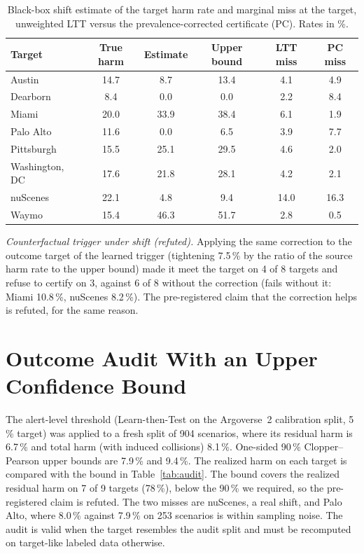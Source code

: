 \documentclass[lettersize,journal]{IEEEtran}
\begin{document}
\begin{table}[h]
\caption{Black-box shift estimate of the target harm rate and marginal miss
at the target, unweighted LTT versus the prevalence-corrected certificate
(PC). Rates in \%.}
\label{tab:prev}
\centering
\scriptsize\setlength{\tabcolsep}{2.5pt}
\begin{tabular}{lccccc}
\toprule
Target & True harm & Estimate & Upper bound & LTT miss & PC miss \\
\midrule
Austin & 14.7 & 8.7 & 13.4 & 4.1 & 4.9 \\
Dearborn & 8.4 & 0.0 & 0.0 & 2.2 & 8.4 \\
Miami & 20.0 & 33.9 & 38.4 & 6.1 & 1.9 \\
Palo Alto & 11.6 & 0.0 & 6.5 & 3.9 & 7.7 \\
Pittsburgh & 15.5 & 25.1 & 29.5 & 4.6 & 2.0 \\
Washington, DC & 17.6 & 21.8 & 28.1 & 4.2 & 2.1 \\
nuScenes & 22.1 & 4.8 & 9.4 & 14.0 & 16.3 \\
Waymo & 15.4 & 46.3 & 51.7 & 2.8 & 0.5 \\
\bottomrule
\end{tabular}
\end{table}

\emph{Counterfactual trigger under shift (refuted).} Applying the same
correction to the outcome target of the learned trigger (tightening
7.5\,\% by the ratio of the source harm rate to the upper bound) made it
meet the target on 4 of 8 targets and refuse to certify on 3, against 6 of 8
without the correction (fails without it: Miami 10.8\,\%, nuScenes 8.2\,\%).
The pre-registered claim that the correction helps is refuted, for the
same reason.

\section{Outcome Audit With an Upper Confidence Bound}
\label{sec:s-audit}
The alert-level threshold (Learn-then-Test on the Argoverse~2 calibration
split, 5\,\% target) was applied to a fresh split of 904 scenarios, where
its residual harm is 6.7\,\% and total harm (with induced collisions) 8.1\,\%.
One-sided 90\,\% Clopper--Pearson upper bounds are 7.9\,\% and 9.4\,\%. The
realized harm on each target is compared with the bound in
Table~\ref{tab:audit}. The bound covers the realized residual harm on 7
of 9 targets (78\,\%), below the 90\,\% we required, so the
pre-registered claim is refuted. The two misses are nuScenes, a real
shift, and Palo Alto, where 8.0\,\% against 7.9\,\% on 253 scenarios is within
sampling noise. The audit is valid when the target resembles the audit
split and must be recomputed on target-like labeled data otherwise.
\end{document}
